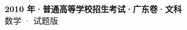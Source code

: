\documentclass[zihao=-4, a4paper]{ctexart}
\begin{document}
\begin{center}
  {\Large\bfseries 2010 年·普通高等学校招生考试·广东卷·文科}\\[4pt]
  {\large 数学 · 试题版}
\end{center}
\medskip
{}

\end{document}
